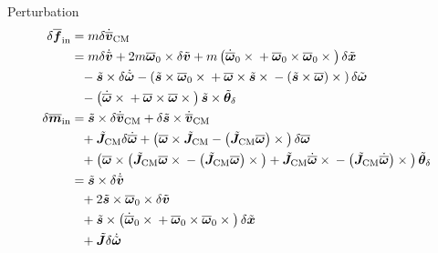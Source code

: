 \documentclass[10pt,fleqn,subeqn]{report}
\newcommand{\T}[1]{\bm{#1}}
\newcommand{\TT}[1]{\bm{#1}}
\begin{document}
Perturbation
\begin{subequations}
\begin{align}
	\delta\overline{\T{f}}_{\text{in}}
	&= m \delta\dot{\overline{\T{v}}}_{\text{CM}}
	\nonumber \\
	&= m \delta\dot{\tilde{\T{v}}}
	+ 2 m \overline{\T{\omega}}_0 \times \delta\tilde{\T{v}}
	+ m \plbr{
		\dot{\overline{\T{\omega}}}_0 \times{}
		+ \overline{\T{\omega}}_0 \times \overline{\T{\omega}}_0 \times{}
	} \delta\tilde{\T{x}}
	\nonumber \\ &\hphantom{=}
	- \tilde{\T{s}} \times \delta\dot{\tilde{\T{\omega}}}
	- \plbr{
		\tilde{\T{s}} \times \overline{\T{\omega}}_0 \times{}
		+ \overline{\T{\omega}} \times \tilde{\T{s}} \times{}
		- \plbr{\tilde{\T{s}} \times \overline{\T{\omega}}} \times{}
	} \delta\tilde{\T{\omega}}
	\nonumber \\ &\hphantom{=}
	- \plbr{
		\dot{\overline{\T{\omega}}} \times{}
		+ \overline{\T{\omega}} \times \overline{\T{\omega}} \times{}
	} \tilde{\T{s}} \times \tilde{\T{\theta}}_{\delta}
	\\
%
	\delta\overline{\T{m}}_{\text{in}}
	&= \tilde{\T{s}} \times \delta\dot{\overline{\T{v}}}_{\text{CM}}
	+ \delta\tilde{\T{s}} \times \dot{\overline{\T{v}}}_{\text{CM}}
	\nonumber \\ &\hphantom{=}
	+ \tilde{\TT{J}}_{\text{CM}} \delta\dot{\overline{\T{\omega}}}
	+ \plbr{
		\overline{\T{\omega}} \times \tilde{\TT{J}}_{\text{CM}}
		- \plbr{\tilde{\TT{J}}_{\text{CM}} \overline{\T{\omega}}} \times{}
	} \delta\overline{\T{\omega}}
	\nonumber \\ &\hphantom{=}
	+ \plbr{
		\overline{\T{\omega}} \times \plbr{
			\tilde{\TT{J}}_{\text{CM}} \overline{\T{\omega}} \times{}
			- \plbr{\tilde{\TT{J}}_{\text{CM}} \overline{\T{\omega}}} \times{}
		}
		+ \tilde{\TT{J}}_{\text{CM}} \dot{\overline{\T{\omega}}} \times{}
		- \plbr{\tilde{\TT{J}}_{\text{CM}} \dot{\overline{\T{\omega}}}} \times{}
	} \tilde{\T{\theta}}_{\delta}
	\nonumber \\
	&= \tilde{\T{s}} \times \delta\dot{\tilde{\T{v}}}
	\nonumber \\ &\hphantom{=}
	+ 2 \tilde{\T{s}} \times \overline{\T{\omega}}_0 \times \delta\tilde{\T{v}}
	\nonumber \\ &\hphantom{=}
	+ \tilde{\T{s}} \times \plbr{
		\dot{\overline{\T{\omega}}}_0 \times{}
		+ \overline{\T{\omega}}_0 \times \overline{\T{\omega}}_0 \times{}
	} \delta\tilde{\T{x}}
	\nonumber \\ &\hphantom{=}
	+ \tilde{\TT{J}} \delta\dot{\tilde{\T{\omega}}}

\end{align}
\end{subequations}
\end{document}
